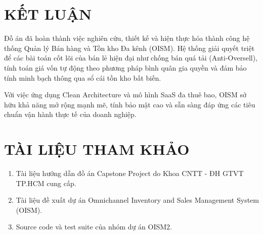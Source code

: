 \documentclass[12pt,a4paper]{report}
\begin{document}
	\chapter*{KẾT LUẬN}
	Đồ án đã hoàn thành việc nghiên cứu, thiết kế và hiện thực hóa thành công hệ thống Quản lý Bán hàng và Tồn kho Đa kênh (OISM). Hệ thống giải quyết triệt để các bài toán cốt lõi của bán lẻ hiện đại như chống bán quá tải (Anti-Oversell), tính toán giá vốn tự động theo phương pháp bình quân gia quyền và đảm bảo tính minh bạch thông qua sổ cái tồn kho bất biến. 
	
	Với việc ứng dụng Clean Architecture và mô hình SaaS đa thuê bao, OISM sở hữu khả năng mở rộng mạnh mẽ, tính bảo mật cao và sẵn sàng đáp ứng các tiêu chuẩn vận hành thực tế của doanh nghiệp.
	
	\chapter*{TÀI LIỆU THAM KHẢO}
	\begin{enumerate}
		\item Tài liệu hướng dẫn đồ án Capstone Project do Khoa CNTT - ĐH GTVT TP.HCM cung cấp.
		\item Tài liệu đề xuất dự án Omnichannel Inventory and Sales Management System (OISM).
		\item Source code và test suite của nhóm dự án OISM2.
	\end{enumerate}
\end{document}
